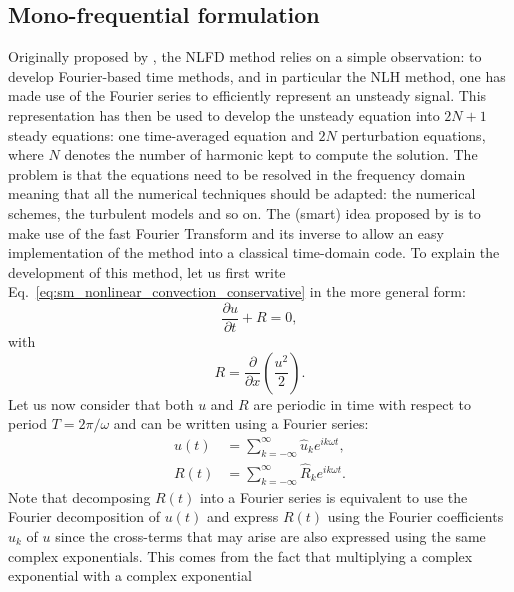 
\subsection{Mono-frequential formulation}

Originally proposed by \citet{McMullen2001}, the NLFD
method relies on a simple observation: 
to develop Fourier-based time methods, and in
particular the NLH method, one has made use of the Fourier
series to efficiently represent an unsteady signal.
This representation has then be used to develop the unsteady
equation into $2N+1$ steady equations: one time-averaged equation
and $2N$ perturbation equations, 
where $N$ denotes the number
of harmonic kept to compute the solution.
The problem is that the equations need to be 
resolved in the frequency domain meaning
that all the numerical techniques should be adapted: the numerical schemes,
the turbulent models and so on. The (smart) idea 
proposed by \citet{McMullen2001} is to
make use of the fast Fourier Transform and its inverse to
allow an easy implementation of the method into a classical time-domain code.
To explain the development of this method, let us first 
write Eq.~\eqref{eq:sm_nonlinear_convection_conservative} 
in the more general form:
\begin{equation}
	\frac{\partial u}{\partial t} + R = 0,
	\label{eq:sm_nonlinear_convection_residual}
\end{equation}
with
\begin{equation}
	R = \frac{\partial}{\partial x} \left( 
	\frac{u^2}{2} \right).
\end{equation}
Let us now consider that both $u$ and $R$ are periodic
in time with respect to period $T = 2 \pi / \omega$
and can be written using a Fourier series:
\begin{equation}
	\begin{split}
		u(t) &= \sum_{k=-\infty}^{\infty} \widehat{u}_k e^{i k \omega t}, \\
		R(t) &= \sum_{k=-\infty}^{\infty} \widehat{R}_k e^{i k \omega t}.
	\end{split}
\end{equation}
Note that decomposing $R(t)$ into a Fourier series is equivalent
to use the Fourier decomposition of $u(t)$ and express
$R(t)$ using the Fourier coefficients $\widehat{u}_k$ of $u$
since the cross-terms that may arise are also expressed 
using the same complex exponentials. This comes from the fact
that multiplying a complex exponential with a complex exponential
